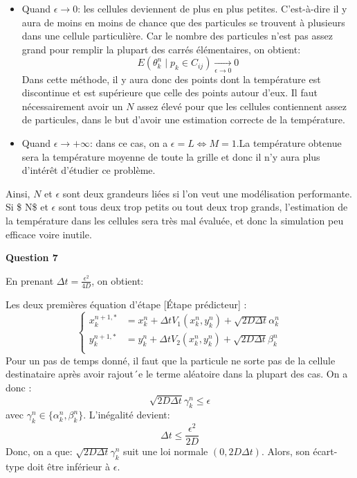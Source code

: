 \documentclass[
  11pt,
  dvipsnames]{article}
\providecommand{\tightlist}{%
  \setlength{\itemsep}{0pt}\setlength{\parskip}{0pt}}
\begin{document}
\begin{itemize}
\tightlist
\item
  Quand \(\epsilon \to 0\): les cellules deviennent de plus en plus petites. C'est-à-dire il y aura de moins en moins de chance que des particules se trouvent à plusieurs dans une cellule particulière. Car le nombre des particules n'est pas assez grand pour remplir la plupart des carrés élémentaires, on obtient:
  \[ E(\theta_k^n\mid p_k \in C_{ij}) \underset{\epsilon \to 0}{\longrightarrow} 0\]
  Dans cette méthode, il y aura donc des points dont la température est discontinue et est supérieure que celle des points autour d'eux. Il faut nécessairement avoir un \(N\) assez élevé pour que les cellules contiennent assez de particules, dans le but d'avoir une estimation correcte de la température.
\item
  Quand \(\epsilon \to +\infty\): dans ce cas, on a \(\epsilon = L \Leftrightarrow M=1\).La température obtenue sera la température moyenne de toute la grille et donc il n'y aura plus d'intérêt d'étudier ce problème.
\end{itemize}

Ainsi, \(N\) et \(\epsilon\) sont deux grandeurs liées si l'on veut une modélisation performante. Si \$ N\$ et \(\epsilon\) sont tous deux trop petits ou tout deux trop grands, l'estimation de la température dans les cellules sera très mal évaluée, et donc la simulation peu efficace voire inutile.

\textbf{Question 7}

En prenant \(\Delta t = \frac {\epsilon^2}{4D}\), on obtient:

Les deux premières équation d'étape {[}Étape prédicteur{]} :
\[\begin{cases}
x_k^{n+1,*}&=x_k^n + \Delta t V_1(x_k^n,y_k^n)+\sqrt{2D\Delta t}\alpha_k^n\\
y_k^{n+1,*}&=y_k^n + \Delta t V_2(x_k^n,y_k^n)+\sqrt{2D\Delta t}\beta_k^n\\
\end{cases}\]
Pour un pas de temps donné, il faut que la particule ne sorte pas de la cellule destinataire après avoir rajout´e le terme aléatoire dans la plupart des cas. On a donc :
\[\sqrt{2D\Delta t}\gamma_k^n \leq \epsilon\]
avec \(\gamma_k^n \in \{\alpha_k^n,\beta_k^n\}\). L'inégalité devient:
\[ \Delta t \leq \frac {\epsilon^2}{2D}\]
Donc, on a que: \(\sqrt{2D\Delta t}\gamma_k^n\) suit une loi normale \((0,2D \Delta t)\). Alors, son écart-type doit être inférieur à \(\epsilon\).
\end{document}
